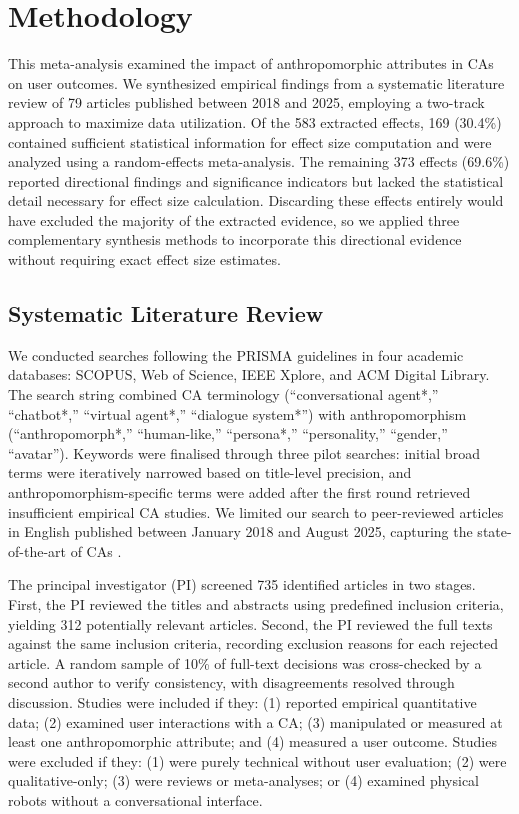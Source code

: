 \documentclass[lettersize,journal]{IEEEtran}
\begin{document}
\section{Methodology}
This meta-analysis examined the impact of anthropomorphic attributes in CAs on user outcomes. We synthesized empirical findings from a systematic literature review \cite{amin2025anthropomorphism} of 79 articles published between 2018 and 2025, employing a two-track approach to maximize data utilization. Of the 583 extracted effects, 169 (30.4\%) contained sufficient statistical information for effect size computation and were analyzed using a random-effects meta-analysis. The remaining 373 effects (69.6\%) reported directional findings and significance indicators but lacked the statistical detail necessary for effect size calculation. Discarding these effects entirely would have excluded the majority of the extracted evidence, so we applied three complementary synthesis methods to incorporate this directional evidence without requiring exact effect size estimates.

\subsection{Systematic Literature Review}

We conducted searches following the PRISMA guidelines \cite{page_prisma_2021} in four academic databases: SCOPUS, Web of Science, IEEE Xplore, and ACM Digital Library. The search string combined CA terminology (``conversational agent*,'' ``chatbot*,'' ``virtual agent*,'' ``dialogue system*'') with anthropomorphism (``anthropomorph*,'' ``human-like,'' ``persona*,'' ``personality,'' ``gender,'' ``avatar''). Keywords were finalised through three pilot searches: initial broad terms were iteratively narrowed based on title-level precision, and anthropomorphism-specific terms were added after the first round retrieved insufficient empirical CA studies. We limited our search to peer-reviewed articles in English published between January 2018 and August 2025, capturing the state-of-the-art of CAs \cite{zhang2018personalizing}. %

The principal investigator (PI) screened 735 identified articles in two stages. First, the PI reviewed the titles and abstracts using predefined inclusion criteria, yielding 312 potentially relevant articles. Second, the PI reviewed the full texts against the same inclusion criteria, recording exclusion reasons for each rejected article. A random sample of 10\% of full-text decisions was cross-checked by a second author to verify consistency, with disagreements resolved through discussion. Studies were included if they: (1) reported empirical quantitative data; (2) examined user interactions with a CA; (3) manipulated or measured at least one anthropomorphic attribute; and (4) measured a user outcome. Studies were excluded if they: (1) were purely technical without user evaluation; (2) were qualitative-only; (3) were reviews or meta-analyses; or (4) examined physical robots without a conversational interface.
\end{document}
